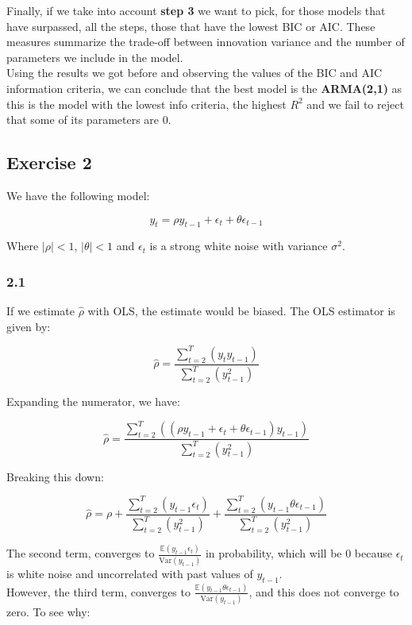 \documentclass{article}
\begin{document}
Finally, if we take into account \textbf{step 3} we want to pick, for those models that have surpassed, all the steps,
those that have the lowest BIC or AIC. These measures summarize the trade-off between innovation variance
and the number of parameters we include in the model. \\

Using the results we got before and observing the values of the BIC and AIC information criteria, we can
conclude that the best model is the \textbf{ARMA(2,1)} as this is the model with the lowest info criteria, the highest $R^2$
and we fail to reject that some of its parameters are 0. 


\subsection*{Exercise 2}

We have the following model:

\[
y_{t}= \rho y_{t-1} + \epsilon_{t}+ \theta \epsilon_{t-1} 
\]

Where $|\rho|<1$, $|\theta|<1$ and $\epsilon_{t}$ is a strong white noise with variance $\sigma^{2}$.

\subsubsection*{2.1}

If we estimate $\hat{\rho}$ with OLS, the estimate would be biased. The OLS estimator is given by:

\[
\hat{\rho}=\frac{\sum_{t=2}^{T}(y_{t}y_{t-1})}{\sum_{t=2}^{T}(y_{t-1}^{2})}
\]

Expanding the numerator, we have:

\[
\hat{\rho}=\frac{\sum_{t=2}^{T}((\rho y_{t-1} + \epsilon_{t} + \theta \epsilon_{t-1})y_{t-1})}{\sum_{t=2}^{T}(y_{t-1}^{2})}
\]

Breaking this down:

\[
\hat{\rho}= \rho + \frac{\sum_{t=2}^{T}(y_{t-1}\epsilon_{t})}{\sum_{t=2}^{T}(y_{t-1}^{2})} + \frac{\sum_{t=2}^{T}(y_{t-1}\theta\epsilon_{t-1})}{\sum_{t=2}^{T}(y_{t-1}^{2})}
\]

The second term, converges to $\frac{\mathbb{E}(y_{t-1}\epsilon_{t})}{\text{Var}(y_{t-1})}$ in probability, which will be 0  because $\epsilon_{t}$ is white noise and uncorrelated with past values of $y_{t-1}$. \\

However, the third term, converges to $\frac{\mathbb{E}(y_{t-1}\theta\epsilon_{t-1})}{\text{Var}(y_{t-1})}$, and this does not converge to zero. To see why:
\end{document}
